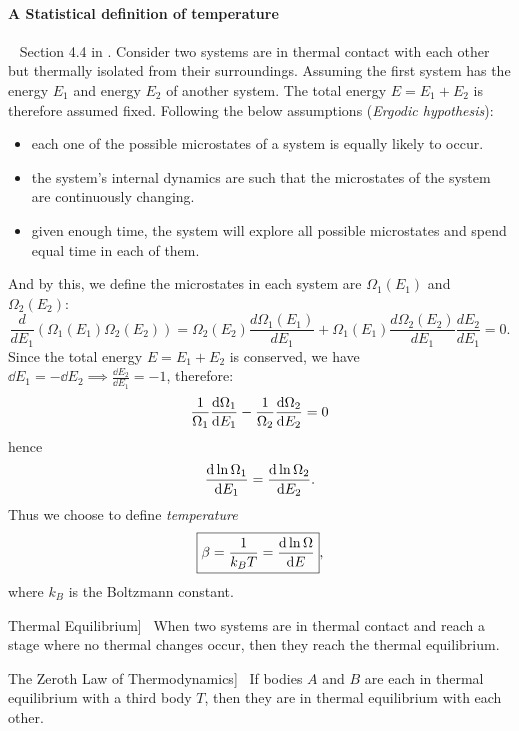 \documentclass[UTF8]{book}
\newenvironment{theorem}[2][Theorem]{\begin{trivlist}
\item[\hskip \labelsep {\bfseries #1}\hskip \labelsep {\bfseries }]}{\end{trivlist}}
\begin{document}
\paragraph{A Statistical definition of temperature}
~ Section 4.4 in \cite{blundell-concepts}. Consider two systems are in thermal contact with each other but thermally isolated from their surroundings. Assuming the first system has the energy $E_1$ and energy $E_2$ of another system. The total energy $E=E_1+E_2$ is therefore assumed fixed. Following the below assumptions (\textsl{Ergodic hypothesis}):
\begin{itemize}
\item  {each one of the possible microstates of a system is equally likely to occur.}
\item  {the system's internal dynamics are such that the microstates of the system are continuously changing.}
\item  {given enough time, the system will explore all possible microstates and spend equal time in each of them.}
\end{itemize}

And by this, we define the microstates in each system are $\Omega _1(E_1)$ and $\Omega _2(E_2)$:
$$\dfrac{d}{dE_1}(\Omega _1(E_1)\Omega _2(E_2))=\Omega _2(E_2)\dfrac{d\Omega _1(E_1)}{dE_1}+\Omega _1(E_1)\dfrac{d\Omega _2(E_2)}{dE_1}\dfrac{dE_2}{dE_1}=0.$$
Since the total energy $E=E_1+E_2$ is conserved, we have $\dd{E_1}=-\dd{E_2}
 \implies \frac{\dd{E_2}}{\dd{E_1}}=-1$, therefore:
$$ \frac{1}{\Omega _1}\dv{\Omega _1}{E_1}-\frac{1}{\Omega _2}\dv{\Omega _2}{E_2}=0$$
hence
\[\dv{\ln \Omega _1}{E_1}=\dv{\ln \Omega _2}{E_2}.\]
Thus we choose to define \emph{temperature}
$$\boxed{\beta=\dfrac{1}{k_BT}=\dv{\ln \Omega }{E}},$$
where $k_B$ is the Boltzmann constant.

\begin{theorem}
[Thermal Equilibrium]~  {When two systems are in thermal contact and reach a stage where no thermal changes occur, then they reach the thermal equilibrium.}
\end{theorem}

\begin{theorem}
[The Zeroth Law of Thermodynamics]~ If bodies $A$ and $B$ are each in thermal equilibrium with a third body $T$, then they are in thermal equilibrium with each other.
\end{theorem}
\end{document}
